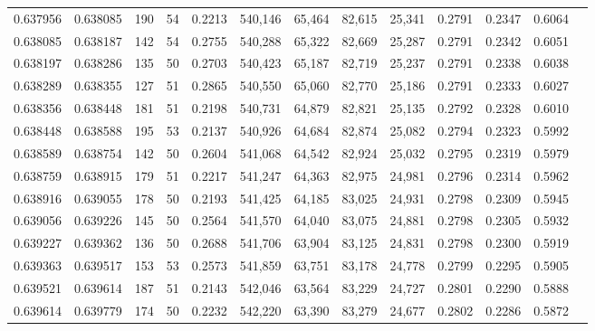 \begin{tabular}{rrrrrrrrrrrrr}
0.637956 & 0.638085 &   190 &  54 &                                     0.2213 & 540,146 &  65,464 &  82,615 &  25,341 & 0.2791 & 0.2347 & 0.6064 \\
0.638085 & 0.638187 &   142 &  54 &                                     0.2755 & 540,288 &  65,322 &  82,669 &  25,287 & 0.2791 & 0.2342 & 0.6051 \\
0.638197 & 0.638286 &   135 &  50 &                                     0.2703 & 540,423 &  65,187 &  82,719 &  25,237 & 0.2791 & 0.2338 & 0.6038 \\
0.638289 & 0.638355 &   127 &  51 &                                     0.2865 & 540,550 &  65,060 &  82,770 &  25,186 & 0.2791 & 0.2333 & 0.6027 \\
0.638356 & 0.638448 &   181 &  51 &                                     0.2198 & 540,731 &  64,879 &  82,821 &  25,135 & 0.2792 & 0.2328 & 0.6010 \\
0.638448 & 0.638588 &   195 &  53 &                                     0.2137 & 540,926 &  64,684 &  82,874 &  25,082 & 0.2794 & 0.2323 & 0.5992 \\
0.638589 & 0.638754 &   142 &  50 &                                     0.2604 & 541,068 &  64,542 &  82,924 &  25,032 & 0.2795 & 0.2319 & 0.5979 \\
0.638759 & 0.638915 &   179 &  51 &                                     0.2217 & 541,247 &  64,363 &  82,975 &  24,981 & 0.2796 & 0.2314 & 0.5962 \\
0.638916 & 0.639055 &   178 &  50 &                                     0.2193 & 541,425 &  64,185 &  83,025 &  24,931 & 0.2798 & 0.2309 & 0.5945 \\
0.639056 & 0.639226 &   145 &  50 &                                     0.2564 & 541,570 &  64,040 &  83,075 &  24,881 & 0.2798 & 0.2305 & 0.5932 \\
0.639227 & 0.639362 &   136 &  50 &                                     0.2688 & 541,706 &  63,904 &  83,125 &  24,831 & 0.2798 & 0.2300 & 0.5919 \\
0.639363 & 0.639517 &   153 &  53 &                                     0.2573 & 541,859 &  63,751 &  83,178 &  24,778 & 0.2799 & 0.2295 & 0.5905 \\
0.639521 & 0.639614 &   187 &  51 &                                     0.2143 & 542,046 &  63,564 &  83,229 &  24,727 & 0.2801 & 0.2290 & 0.5888 \\
0.639614 & 0.639779 &   174 &  50 &                                     0.2232 & 542,220 &  63,390 &  83,279 &  24,677 & 0.2802 & 0.2286 & 0.5872 \\

\end{tabular}
